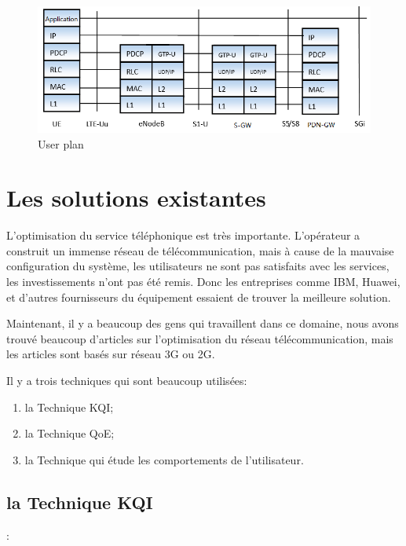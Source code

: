 \begin{figure}[H]
\centering
\includegraphics[width=0.9\linewidth]{images/S1-U}
\caption{User plan}
\label{fig:S1-U}
\end{figure}


\section{Les solutions existantes}

L'optimisation du service téléphonique est très importante. L'opérateur a construit un immense réseau de télécommunication, mais à cause de la mauvaise configuration du système, les utilisateurs ne sont pas satisfaits avec les services, les investissements n'ont pas été remis. Donc les entreprises comme IBM, Huawei, et d'autres fournisseurs du équipement essaient de trouver la meilleure solution. 

Maintenant, il y a beaucoup des gens qui travaillent dans ce domaine, nous avons trouvé beaucoup d'articles sur l'optimisation du réseau télécommunication, mais les articles sont basés sur réseau 3G ou 2G. 

Il y a trois techniques qui sont beaucoup utilisées:
\begin{enumerate}
\item \textsf{la Technique KQI};
\item \textsf{la Technique QoE};
\item \textsf{la Technique qui étude les comportements de l'utilisateur}.
\end{enumerate}

\subsection{la Technique KQI}:

